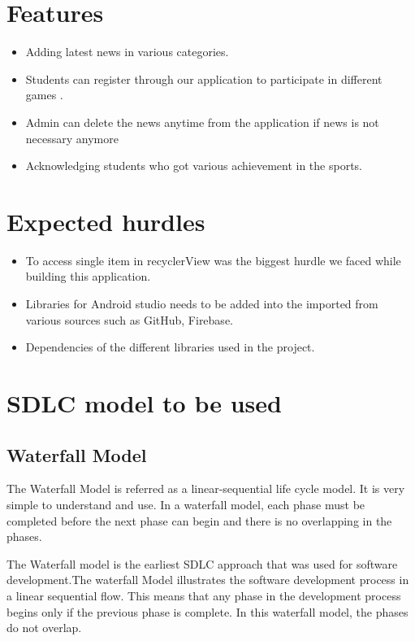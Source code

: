 \section{Features}
\begin{itemize}
	\item Adding latest news in various categories.
	\item Students can register through our application to participate in different games .
	\item Admin can delete the news anytime from the application if news is not necessary anymore 
	 \item Acknowledging students who got various achievement in the sports.
\end{itemize}

	 	
\section{Expected hurdles}
\begin{itemize}
\item To access single item in recyclerView was the biggest hurdle we faced while building this application.
\item Libraries for Android studio needs to be added into the imported from various sources such as GitHub, Firebase.
\item Dependencies of the different libraries used in the project.

\end{itemize}

\section{SDLC model to be used}
\subsection{Waterfall Model}
 
The Waterfall Model is referred as a linear-sequential life cycle model. It is very simple to understand and use. In a waterfall model, each phase must be completed before the next phase can begin and there is no overlapping in the phases.

The Waterfall model is the earliest SDLC approach that was used for software development.The waterfall Model illustrates the software development process in a linear sequential flow. This means that any phase in the development process begins only if the previous phase is complete. In this waterfall model, the phases do not overlap.

